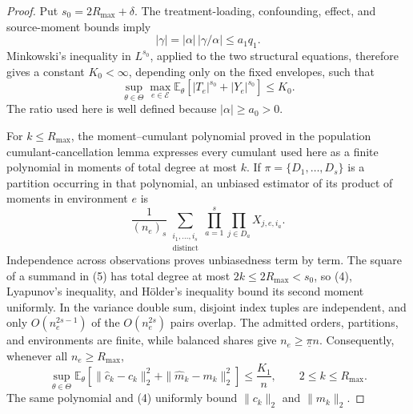 \documentclass{article}
\begin{document}
\begin{proof}
Put \(s_0=2R_{\max}+\delta\).  The treatment-loading, confounding, effect, and source-moment bounds imply
\[
 |\gamma|=|\alpha|\,|\gamma/\alpha|\leq a_1q_1.
\]
Minkowski's inequality in \(L^{s_0}\), applied to the two structural equations, therefore gives a constant \(K_0<\infty\), depending only on the fixed envelopes, such that
\[
 \sup_{\theta\in\Theta}\max_{e\in\mathcal E}
 \mathbb E_\theta\left[|T_e|^{s_0}+|Y_e|^{s_0}\right]\leq K_0.           \tag{4}
\]
The ratio used here is well defined because \(|\alpha|\geq a_0>0\).

For \(k\leq R_{\max}\), the moment--cumulant polynomial proved in the population cumulant-cancellation lemma expresses every cumulant used here as a finite polynomial in moments of total degree at most \(k\).  If \(\pi=\{D_1,\ldots,D_s\}\) is a partition occurring in that polynomial, an unbiased estimator of its product of moments in environment \(e\) is
\[
 \frac1{(n_e)_s}
 \sum_{\substack{i_1,\ldots,i_s\\\text{distinct}}}
 \prod_{a=1}^s\prod_{j\in D_a}X_{j,e,i_a}.                               \tag{5}
\]
Independence across observations proves unbiasedness term by term.  The square of a summand in (5) has total degree at most \(2k\leq2R_{\max}<s_0\), so (4), Lyapunov's inequality, and H\"older's inequality bound its second moment uniformly.  In the variance double sum, disjoint index tuples are independent, and only \(O(n_e^{2s-1})\) of the \(O(n_e^{2s})\) pairs overlap.  The admitted orders, partitions, and environments are finite, while balanced shares give \(n_e\geq\underline\pi n\).  Consequently, whenever all \(n_e\geq R_{\max}\),
\[
 \sup_{\theta\in\Theta}
 \mathbb E_\theta\left[
  \|\widehat c_k-c_k\|_2^2+\|\widehat m_k-m_k\|_2^2
 \right]\leq\frac{K_1}{n},
 \qquad 2\leq k\leq R_{\max}.                                           \tag{6}
\]
The same polynomial and (4) uniformly bound \(\|c_k\|_2\) and \(\|m_k\|_2\).


\end{proof}
\end{document}
